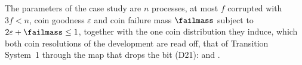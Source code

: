 \begin{definition}
  \label{def:aba-params}
  \leanok
  The parameters of the case study are $n$ processes, at most $f$ corrupted with $3f < n$, coin goodness $\varepsilon$ and coin failure mass $\failmass$ subject to $2\varepsilon + \failmass \le 1$, together with the one coin distribution they induce, which both coin resolutions of the development are read off, that of Transition System~1 through the map that drops the bit (D21):  and .
\end{definition}
